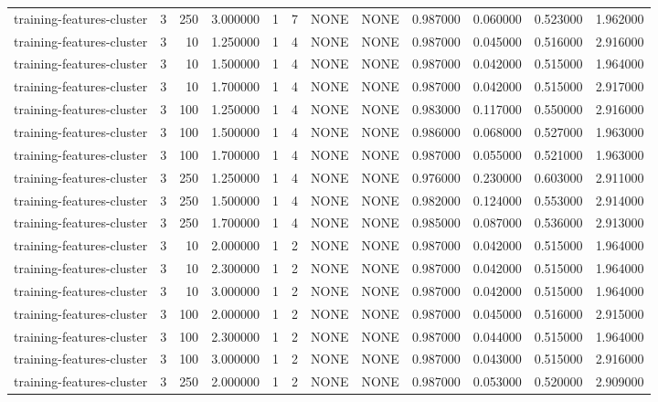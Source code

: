 \begin{tabular}{lrrrllllrrrr}
training-features-cluster & 3 & 250 & 3.000000 & 1 & 7 & NONE & NONE & 0.987000 & 0.060000 & 0.523000 & 1.962000 \\
training-features-cluster & 3 & 10 & 1.250000 & 1 & 4 & NONE & NONE & 0.987000 & 0.045000 & 0.516000 & 2.916000 \\
training-features-cluster & 3 & 10 & 1.500000 & 1 & 4 & NONE & NONE & 0.987000 & 0.042000 & 0.515000 & 1.964000 \\
training-features-cluster & 3 & 10 & 1.700000 & 1 & 4 & NONE & NONE & 0.987000 & 0.042000 & 0.515000 & 2.917000 \\
training-features-cluster & 3 & 100 & 1.250000 & 1 & 4 & NONE & NONE & 0.983000 & 0.117000 & 0.550000 & 2.916000 \\
training-features-cluster & 3 & 100 & 1.500000 & 1 & 4 & NONE & NONE & 0.986000 & 0.068000 & 0.527000 & 1.963000 \\
training-features-cluster & 3 & 100 & 1.700000 & 1 & 4 & NONE & NONE & 0.987000 & 0.055000 & 0.521000 & 1.963000 \\
training-features-cluster & 3 & 250 & 1.250000 & 1 & 4 & NONE & NONE & 0.976000 & 0.230000 & 0.603000 & 2.911000 \\
training-features-cluster & 3 & 250 & 1.500000 & 1 & 4 & NONE & NONE & 0.982000 & 0.124000 & 0.553000 & 2.914000 \\
training-features-cluster & 3 & 250 & 1.700000 & 1 & 4 & NONE & NONE & 0.985000 & 0.087000 & 0.536000 & 2.913000 \\
training-features-cluster & 3 & 10 & 2.000000 & 1 & 2 & NONE & NONE & 0.987000 & 0.042000 & 0.515000 & 1.964000 \\
training-features-cluster & 3 & 10 & 2.300000 & 1 & 2 & NONE & NONE & 0.987000 & 0.042000 & 0.515000 & 1.964000 \\
training-features-cluster & 3 & 10 & 3.000000 & 1 & 2 & NONE & NONE & 0.987000 & 0.042000 & 0.515000 & 1.964000 \\
training-features-cluster & 3 & 100 & 2.000000 & 1 & 2 & NONE & NONE & 0.987000 & 0.045000 & 0.516000 & 2.915000 \\
training-features-cluster & 3 & 100 & 2.300000 & 1 & 2 & NONE & NONE & 0.987000 & 0.044000 & 0.515000 & 1.964000 \\
training-features-cluster & 3 & 100 & 3.000000 & 1 & 2 & NONE & NONE & 0.987000 & 0.043000 & 0.515000 & 2.916000 \\
training-features-cluster & 3 & 250 & 2.000000 & 1 & 2 & NONE & NONE & 0.987000 & 0.053000 & 0.520000 & 2.909000 \\

\end{tabular}
